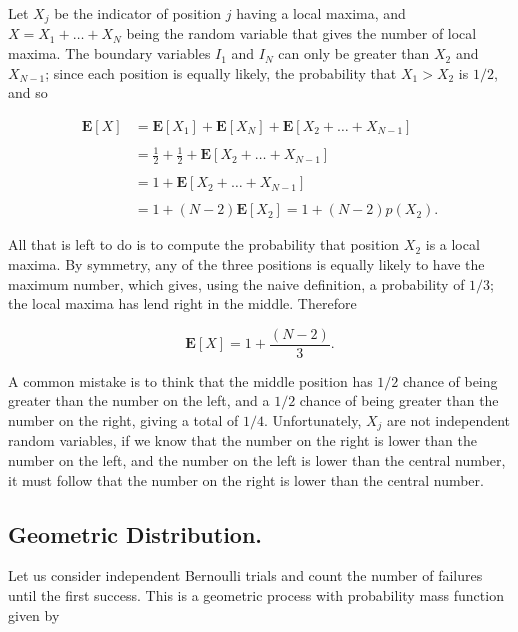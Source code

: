 \documentclass[12pt]{article}
\begin{document}
Let $X_j$ be the indicator of position $j$ having a local maxima, and 
$X = X_{1} + \ldots + X_{N}$ being the random variable that gives the number of
local maxima. The boundary variables $I_{1}$ and $I_{N}$ can only be greater
than $X_{2}$ and $X_{N-1}$; since each position is equally likely, the probability
that $X_{1} > X_{2}$ is $1/2$, and so

\begin{align}
\mathbf{E} [ X ] &= 
\mathbf{E} [ X_{1} ] + \mathbf{E} [ X_{N} ] + 
\mathbf{E} [ X_{2} + \ldots + X_{N - 1} ]
\nonumber \\
\nonumber \\
&= \frac{1}{2} + \frac{1}{2} + 
\mathbf{E} [ X_{2} + \ldots + X_{N - 1} ]
\nonumber \\
\nonumber \\
&= 1 + 
\mathbf{E} [ X_{2} + \ldots + X_{N - 1} ]
\nonumber \\
\nonumber \\
&= 1 + (N - 2) \mathbf{E} [ X_{2} ] = 1 + (N - 2) p(X_{2}).
\end{align}

\noindent
All that is left to do is to compute the probability 
that position $X_{2}$ is a local maxima.
By symmetry, any of the three positions is equally likely 
to have the maximum number, which gives, using the naive definition, 
a probability of $1/3$; the local maxima has lend right in the middle.
Therefore

\begin{equation}
\mathbf{E} [ X ] =
1 + \frac{(N - 2)}{3}	.
\end{equation}

A common mistake is to think that the middle position has 
$1/2$ chance of being greater than the number on the left, and a
$1/2$ chance of being greater than the number on the right, giving
a total of $1/4$. Unfortunately, $X_{j}$ are not independent
random variables, if we know that the number on the right is 
lower than the number on the left, and the number on the left is 
lower than the central number, it must follow that the number on 
the right is lower than the central number.

\subsection{Geometric Distribution.}
Let us consider independent Bernoulli trials and count the number of 
failures until the first success. This is a geometric process
with probability mass function given by
\end{document}
